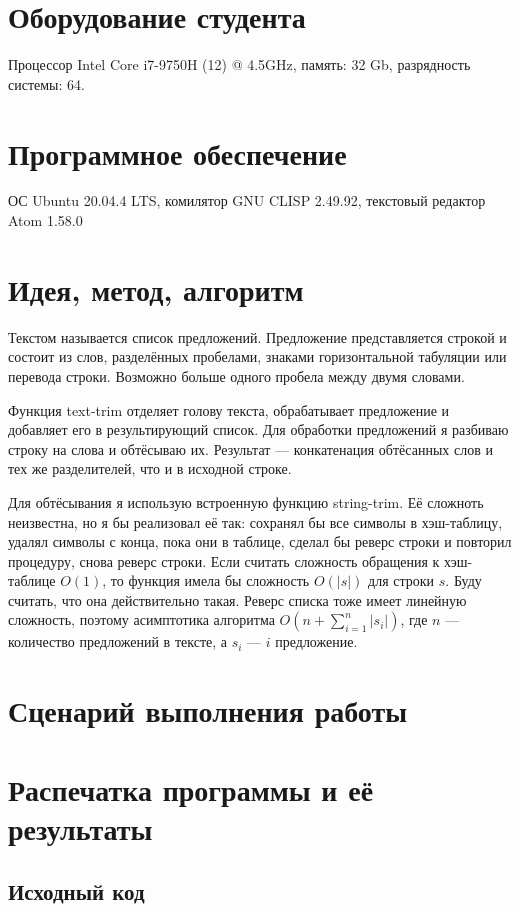 \documentclass[12pt]{article}
\begin{document}
\section{Оборудование студента}
Процессор Intel Core i7-9750H (12) @ 4.5GHz, память: 32 Gb, разрядность системы: 64.

\section{Программное обеспечение}
ОС Ubuntu 20.04.4 LTS, комилятор GNU CLISP 2.49.92, текстовый редактор Atom 1.58.0

\pagebreak
\section{Идея, метод, алгоритм}
Текстом называется список предложений. Предложение представляется строкой и состоит из слов, разделённых пробелами, знаками горизонтальной табуляции или перевода строки. Возможно больше одного пробела между двумя словами.

Функция text-trim отделяет голову текста, обрабатывает предложение и добавляет его в результирующий список. Для обработки предложений я разбиваю строку на слова и обтёсываю их. Результат --- конкатенация обтёсанных слов и тех же разделителей, что и в исходной строке.

Для обтёсывания я использую встроенную функцию string-trim. Её сложноть неизвестна, но я бы реализовал её так: сохранял бы все символы в хэш-таблицу, удалял символы с конца, пока они в таблице, сделал бы реверс строки и повторил процедуру, снова реверс строки. Если считать сложность обращения к хэш-таблице $O(1)$, то функция имела бы сложность $O(|s|)$ для строки $s$. Буду считать, что она действительно такая. Реверс списка тоже имеет линейную сложность, поэтому асимптотика алгоритма $O(n + \sum_{i=1}^n{|s_i|})$, где $n$ --- количество предложений в тексте, а $s_i$ --- $i$ предложение.

\section{Сценарий выполнения работы}

\section{Распечатка программы и её результаты}

\subsection{Исходный код}

\end{document}

